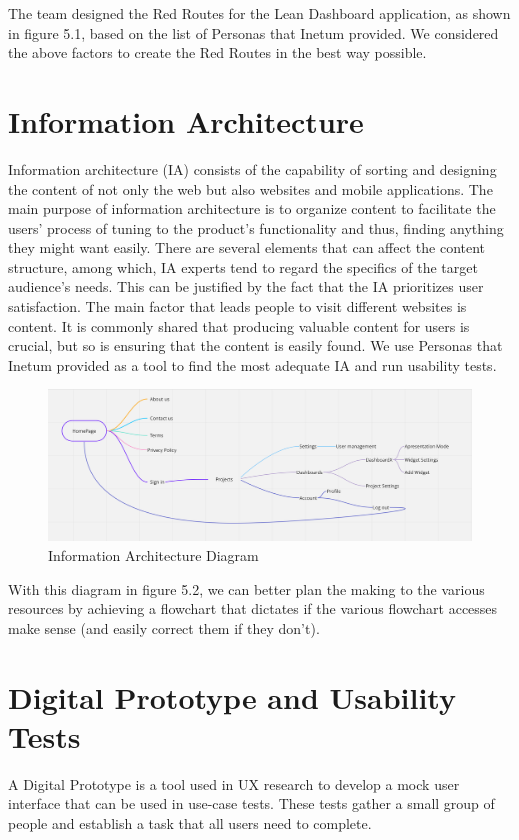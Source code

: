 \documentclass[a4paper,twoside,10pt]{report}
\begin{document}
The team designed the Red Routes for the Lean Dashboard application,  as shown in figure 5.1, based on the list of Personas that Inetum provided. We considered the above factors to create the Red Routes in the best way possible.
\newpage

\section{Information Architecture}
Information architecture (IA) consists of the capability of sorting and designing the content of not only the web but also websites and mobile applications. 
The main purpose of information architecture is to organize content to facilitate the users' process of tuning to the product's functionality and thus, finding anything they might want easily.
There are several elements that can affect the content structure, among which, IA experts tend to regard the specifics of the target audience's needs. This can be justified by the fact that the IA prioritizes user satisfaction.
The main factor that leads people to visit different websites is content. It is commonly shared that producing valuable content for users is crucial, but so is ensuring that the content is easily found. We use Personas that Inetum provided as a tool to find the most adequate IA and run usability tests.
 
\begin{figure}[h!]
\center
  \includegraphics[width=\textwidth]{information-architecture.png}
\caption{Information Architecture Diagram}
\end{figure}

With this diagram in figure 5.2, we can better plan the making to the various resources by achieving a flowchart that dictates if the various flowchart accesses make sense (and easily correct them if they don't).

\newpage
\section{Digital Prototype and Usability Tests}
A Digital Prototype is a tool used in UX research to develop a mock user interface that can be used in use-case tests. These tests gather a small group of people and establish a task that all users need to complete. 
 
\end{document}
